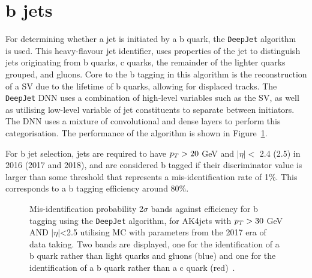 \section{b jets}

For determining whether a jet is initiated by a b quark, the \texttt{DeepJet} algorithm~\cite{CMS:2017wtu,Bols:2020bkb} is used.  
This heavy-flavour jet identifier, uses properties of the jet to distinguish jets originating from b quarks, c quarks, the remainder of the lighter quarks grouped, and gluons.
Core to the b tagging in this algorithm is the reconstruction of a \ac{SV} due to the lifetime of b quarks, allowing for displaced tracks.
The \texttt{DeepJet} \ac{DNN} uses a combination of high-level variables such as the \ac{SV}, as well as utilising low-level variable of jet constituents to separate between initiators.
The \ac{DNN} uses a mixture of convolutional and dense layers to perform this categorisation.
The performance of the algorithm is shown in Figure~\ref{fig:deepjet}.

For b jet selection, jets are required to have $p_{T} > 20$ GeV and $|\eta| <$ 2.4 (2.5) in 2016 (2017 and 2018), and are considered b tagged if their discriminator value is larger than some threshold that represents a mis-identification rate of 1\%.
This corresponds to a b tagging efficiency around 80\%.

\begin{figure}[!hbtp]
\centering
\caption{Mis-identification probability 2$\sigma$ bands against efficiency for b tagging using the \texttt{DeepJet} algorithm, for AK4jets with $p_{T}> 30$ GeV AND $|\eta|$<2.5 utilising MC with parameters from the 2017 era of data taking. Two bands are displayed, one for the identification of a b quark rather than light quarks and gluons (blue) and one for the identification of a b quark rather than a c quark (red)~\cite{deepjet}.}
\label{fig:deepjet}
\end{figure}


